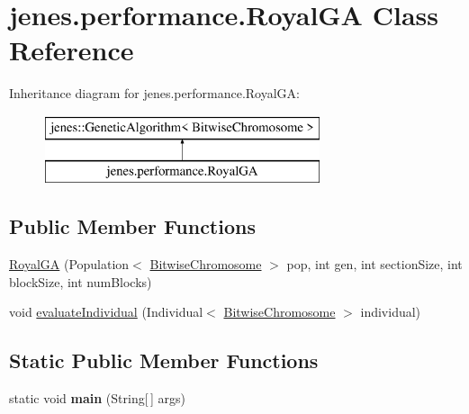 \hypertarget{classjenes_1_1performance_1_1_royal_g_a}{\section{jenes.\-performance.\-Royal\-G\-A Class Reference}
\label{classjenes_1_1performance_1_1_royal_g_a}
}
Inheritance diagram for jenes.\-performance.\-Royal\-G\-A\-:\begin{figure}[H]
\begin{center}
\leavevmode
\includegraphics[height=2.000000cm]{classjenes_1_1performance_1_1_royal_g_a}
\end{center}
\end{figure}
\subsection*{Public Member Functions}
\begin{DoxyCompactItemize}
\item 
\hyperlink{classjenes_1_1performance_1_1_royal_g_a_a6e77c8bfb3b7851b2e78dc907038d557}{Royal\-G\-A} (Population$<$ \hyperlink{classjenes_1_1chromosome_1_1_bitwise_chromosome}{Bitwise\-Chromosome} $>$ pop, int gen, int section\-Size, int block\-Size, int num\-Blocks)
\item 
void \hyperlink{classjenes_1_1performance_1_1_royal_g_a_ad135a4f53db8dcf6972681a8a1ab6f43}{evaluate\-Individual} (Individual$<$ \hyperlink{classjenes_1_1chromosome_1_1_bitwise_chromosome}{Bitwise\-Chromosome} $>$ individual)
\end{DoxyCompactItemize}
\subsection*{Static Public Member Functions}
\begin{DoxyCompactItemize}
\item 
\hypertarget{classjenes_1_1performance_1_1_royal_g_a_a594d9cdab2d9779ea59a67bf67c47e7d}{static void {\bfseries main} (String\mbox{[}$\,$\mbox{]} args)}\label{classjenes_1_1performance_1_1_royal_g_a_a594d9cdab2d9779ea59a67bf67c47e7d}

\end{DoxyCompactItemize}


